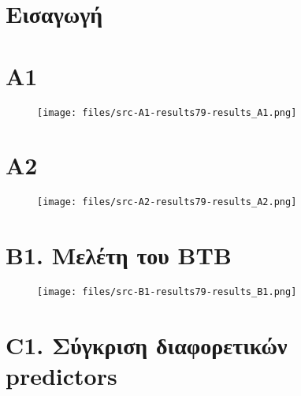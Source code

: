 \documentclass[a4paper,12pt]{article}
\begin{document}
\def\thesection {\roman{section}: }



\section{Εισαγωγή}

\section{A1}

\begin{figure}[H]
    \centering
    \texttt{[image: files/src-A1-results79-results\_A1.png]}
    \caption{}
\end{figure}




\pagebreak


\section{A2}

\begin{figure}[H]
    \centering
    \texttt{[image: files/src-A2-results79-results\_A2.png]}
    \caption{}
\end{figure}



\section{B1. Μελέτη του BTB}

\begin{figure}[H]
    \centering
    \texttt{[image: files/src-B1-results79-results\_B1.png]}
    \caption{}
\end{figure}



\section{C1. Σύγκριση διαφορετικών predictors}
\end{document}
